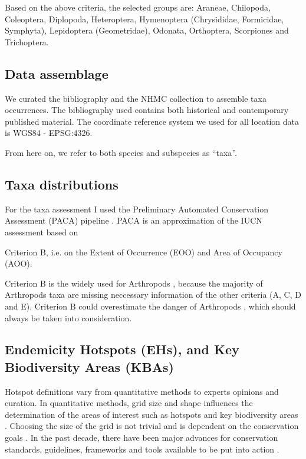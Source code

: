 Based on the above criteria, the selected groups are:
Araneae, Chilopoda, Coleoptera, Diplopoda, Heteroptera, Hymenoptera (Chrysididae, Formicidae, Symphyta), Lepidoptera (Geometridae), Odonata, Orthoptera, Scorpiones and Trichoptera.

    \subsection{Data assemblage}
    \label{subsec:arthropods-data-assemblage}

We curated the bibliography and the NHMC collection to assemble taxa
occurrences. The bibliography used
contains both historical and contemporary published material.
The coordinate reference system we used for all location data is WGS84 - EPSG:4326.

From here on, we refer to both species
and subspecies as “taxa”.
    

    \subsection{Taxa distributions}
    \label{subsec:arthropods-taxa-assessments}
For the taxa assessment I used the Preliminary Automated Conservation Assessment
(PACA) pipeline \parencite{stevart2019a-third}. PACA is an approximation of the IUCN
assessment based on 

Criterion B, i.e. on the Extent of Occurrence (EOO) and
Area of Occupancy (AOO).

Criterion B is the widely used for Arthropods \parencite{cardoso2011adapting,carpaneto2015a-red-list},
because the majority of Arthropods taxa are missing neccessary information of the other criteria (A, C, D and E).
Criterion B could overestimate the danger of Arthropods \parencite{cardoso2011adapting},
which should always be taken into consideration.

    
    \subsection{Endemicity Hotspots (EHs), and Key Biodiversity Areas (KBAs)}
    \label{subsec:arthropods-ehs-kbas}

Hotspot definitions vary from quantitative methods to experts opinions and curation.
In quantitative methods, grid size and shape influences the determination of
the areas of interest such as hotspots and key biodiversity areas \parencite{hurlbert2007species,nhancale2011the-influence}.
Choosing the size of the grid is not trivial \parencite{mo2019influences} and is dependent
on the conservation goals \parencite{margules2000systematic}. In the past decade,
there have been major advances for conservation standards, guidelines,
frameworks and tools available to be put into action \parencite{bongaarts2019ipbes}.


